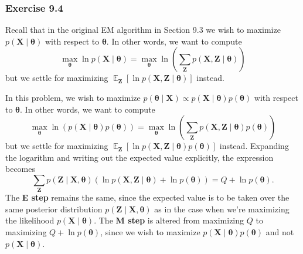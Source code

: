 \documentclass[12pt, a4paper]{article}
\newcommand{\vect}[1]{\bm{#1}}
\DeclareMathOperator{\E}{\mathbb{E}}
\begin{document}
\subsubsection*{Exercise 9.4}
Recall that in the original EM algorithm in Section 9.3 we wish to maximize $p(\vect{X} \mid \vect{\theta})$ with respect to $\vect{\theta}$.
In other words, we want to compute
\begin{equation*}
	\max_{\vect{\theta}} \ln p(\vect{X} \mid \vect{\theta})
	=
	\max_{\vect{\theta}} \ln \left( \sum_{\vect{Z}} p(\vect{X}, \vect{Z} \mid \vect{\theta}) \right)
\end{equation*}
but we settle for maximizing $\E_{\vect{Z}} \left[ \ln p(\vect{X}, \vect{Z} \mid \vect{\theta}) \right]$ instead.

In this problem, we wish to maximize $p(\vect{\theta} \mid \vect{X} ) \propto p(\vect{X} \mid \vect{\theta}) p(\vect{\theta})$ with respect to $\vect{\theta}$.
In other words, we want to compute
\begin{equation*}
\max_{\vect{\theta}} \ln \left( p(\vect{X} \mid \vect{\theta})  p(\vect{\theta}) \right)
=
\max_{\vect{\theta}} \ln \left(  \sum_{\vect{Z}} p(\vect{X}, \vect{Z} \mid \vect{\theta}) p(\vect{\theta}) \right)
\end{equation*}
but we settle for maximizing $\E_{\vect{Z}} \left[ \ln   p(\vect{X}, \vect{Z} \mid \vect{\theta}) p(\vect{\theta})  \right]$ instead.
Expanding the logarithm and writing out the expected value explicitly, the expression becomes
\begin{equation*}
	\sum_{\vect{Z}} p(\vect{Z} \mid \vect{X}, \vect{\theta})
	\left( \ln p(\vect{X}, \vect{Z} \mid \vect{\theta}) + \ln p(\vect{\theta})  \right)
	=
	Q + \ln p(\vect{\theta}).
\end{equation*}
The \textbf{E step} remains the same, since the expected value is to be taken over the same posterior distribution $p(\vect{Z} \mid \vect{X}, \vect{\theta} )$ as in the case when we're maximizing the likelihood $p(\vect{X} \mid \vect{\theta})$.
The \textbf{M step} is altered from maximizing $Q$ to maximizing $Q + \ln p(\vect{\theta})$, since we wish to maximize $p(\vect{X} \mid \vect{\theta}) p(\vect{\theta})$ and not $p(\vect{X} \mid \vect{\theta})$.
\end{document}
